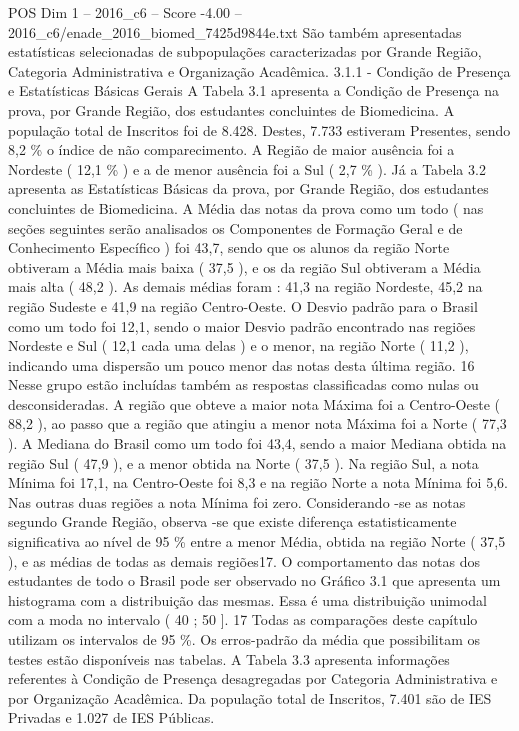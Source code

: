 \begin{textsample}{POS Dim 1 – 2016\_c6 – Score -4.00 – 2016\_c6/enade\_2016\_biomed\_7425d9844e.txt}
São também apresentadas estatísticas selecionadas de subpopulações caracterizadas por Grande Região, Categoria Administrativa e Organização Acadêmica. 3.1.1 - Condição de Presença e Estatísticas Básicas Gerais A Tabela 3.1 apresenta a Condição de Presença na prova, por Grande Região, dos estudantes concluintes de Biomedicina.
A população total de Inscritos foi de 8.428.
Destes, 7.733 estiveram Presentes, sendo 8,2 \% o índice de não comparecimento.
A Região de maior ausência foi a Nordeste ( 12,1 \% ) e a de menor ausência foi a Sul ( 2,7 \% ).
Já a Tabela 3.2 apresenta as Estatísticas Básicas da prova, por Grande Região, dos estudantes concluintes de Biomedicina.
A Média das notas da prova como um todo ( nas seções seguintes serão analisados os Componentes de Formação Geral e de Conhecimento Específico ) foi 43,7, sendo que os alunos da região Norte obtiveram a Média mais baixa ( 37,5 ), e os da região Sul obtiveram a Média mais alta ( 48,2 ).
As demais médias foram : 41,3 na região Nordeste, 45,2 na região Sudeste e 41,9 na região Centro-Oeste.
O Desvio padrão para o Brasil como um todo foi 12,1, sendo o maior Desvio padrão encontrado nas regiões Nordeste e Sul ( 12,1 cada uma delas ) e o menor, na região Norte ( 11,2 ), indicando uma dispersão um pouco menor das notas desta última região. 16 Nesse grupo estão incluídas também as respostas classificadas como nulas ou desconsideradas.
A região que obteve a maior nota Máxima foi a Centro-Oeste ( 88,2 ), ao passo que a região que atingiu a menor nota Máxima foi a Norte ( 77,3 ).
A Mediana do Brasil como um todo foi 43,4, sendo a maior Mediana obtida na região Sul ( 47,9 ), e a menor obtida na Norte ( 37,5 ).
Na região Sul, a nota Mínima foi 17,1, na Centro-Oeste foi 8,3 e na região Norte a nota Mínima foi 5,6.
Nas outras duas regiões a nota Mínima foi zero.
Considerando -se as notas segundo Grande Região, observa -se que existe diferença estatisticamente significativa ao nível de 95 \% entre a menor Média, obtida na região Norte ( 37,5 ), e as médias de todas as demais regiões17.
O comportamento das notas dos estudantes de todo o Brasil pode ser observado no Gráfico 3.1 que apresenta um histograma com a distribuição das mesmas.
Essa é uma distribuição unimodal com a moda no intervalo ( 40 ; 50 ]. 17 Todas as comparações deste capítulo utilizam os intervalos de 95 \%.
Os erros-padrão da média que possibilitam os testes estão disponíveis nas tabelas.
A Tabela 3.3 apresenta informações referentes à Condição de Presença desagregadas por Categoria Administrativa e por Organização Acadêmica.
Da população total de Inscritos, 7.401 são de IES Privadas e 1.027 de IES Públicas.

\end{textsample}
